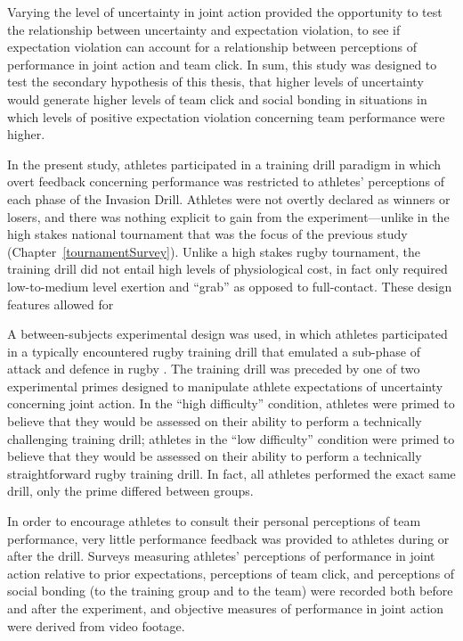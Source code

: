 Varying the level of uncertainty in joint action provided the opportunity to test the relationship between uncertainty and expectation violation, to see if expectation violation can account for a relationship between perceptions of performance in joint action and team click.  In sum, this study was designed to test the secondary hypothesis of this thesis, that higher levels of uncertainty would generate higher levels of team click and social bonding in situations in which levels of positive expectation violation concerning team performance were higher.

In the present study, athletes participated in a training drill paradigm in which overt feedback concerning performance was restricted to athletes' perceptions of each phase of the Invasion Drill.
Athletes were not overtly declared as winners or losers, and there was nothing explicit to gain from the experiment---unlike in the high stakes national tournament that was the focus of the previous study (Chapter~\ref{tournamentSurvey}).  Unlike a high stakes rugby tournament, the training drill did not entail high levels of physiological cost, in fact only required low-to-medium level exertion and ``grab'' as opposed to full-contact.  These design features allowed for

A between-subjects experimental design was used, in which athletes participated in a typically encountered rugby training drill that emulated a sub-phase of attack and defence in rugby \citep{Passos2011}.  The training drill was preceded by one of two experimental primes designed to manipulate athlete expectations of uncertainty concerning joint action.  In the ``high difficulty'' condition, athletes were primed to believe that they would be assessed on their ability to perform a technically challenging training drill; athletes in the ``low difficulty'' condition were primed to believe that they would be assessed on their ability to perform a technically straightforward rugby training drill.  In fact, all athletes performed the exact same drill, only the prime differed between groups.

In order to encourage athletes to consult their personal perceptions of team performance, very little performance feedback was provided to athletes during or after the drill.
Surveys measuring athletes' perceptions of performance in joint action relative to prior expectations, perceptions of team click, and perceptions of social bonding (to the training group and to the team) were recorded both before and after the experiment, and objective measures of performance in joint action were derived from video footage.


